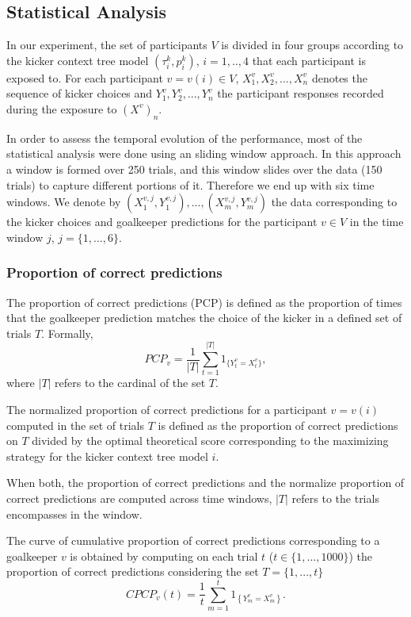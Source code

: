 \documentclass[fleqn,10pt]{wlscirep}
\begin{document}
\subsection*{Statistical Analysis}

In our experiment, the set of participants $V$ is divided in four groups according to the kicker context tree model $(\tau^k_i,p^k_i)$, $i=1,..,4$ that each participant is exposed to. For each participant $v = v(i) \in V$, $X_1^{v}, X_2^{v},...,X_{n}^{v}$ denotes the sequence of kicker choices and $Y_1^{v}, Y_2^{v},...,Y_n^{v}$ the participant responses recorded during the exposure to $(X^{v})_n$. 

In order to assess the temporal evolution of the performance, most of the statistical analysis were done using an sliding window approach. In this approach a window is formed over 250 trials, and this window slides over the data (150 trials) to capture different portions of it. Therefore we end up with six time windows. We denote by $(X_1^{v,j}, Y_1^{v,j}),...,(X_m^{v,j}, Y_m^{v,j})$ the data corresponding to the kicker choices and goalkeeper predictions for the participant $v \in V$ in the time window $j$, $j = \{1,...,6\}$.

\subsubsection*{Proportion of correct predictions}

The proportion of correct predictions (PCP) is defined as the proportion of times that the goalkeeper prediction matches the choice of the kicker in a defined set of trials $T$. Formally, 
\begin{equation}
	PCP_v = \frac{1}{|T|}\sum_{t=1}^{|T|} 1_{\{Y_t^{v} = X_t^{v}\}},
\end{equation}
where $|T|$ refers to the cardinal of the set $T$. 

The normalized proportion of correct predictions for a participant $v = v(i)$ computed in the set of trials $T$ is defined as the proportion of correct predictions on $T$ divided by the optimal theoretical score corresponding to the maximizing strategy for the kicker context tree model $i$.

When both, the proportion of correct predictions and the normalize proportion of correct predictions are computed across time windows, $|T|$ refers to the trials encompasses in the window.  

The curve of cumulative proportion of correct predictions corresponding to a goalkeeper $v$ is obtained by computing on each trial $t$ ($t \in \{1,...,1000\}$) the proportion of correct predictions considering the set $T = \{1,...,t\}$
\begin{equation}
	CPCP_v(t) = \frac{1}{t}\sum_{m=1}^{t} 1_{\left\{Y_m^{v} = X_m^{v}\right\}}.
\end{equation}
\end{document}
